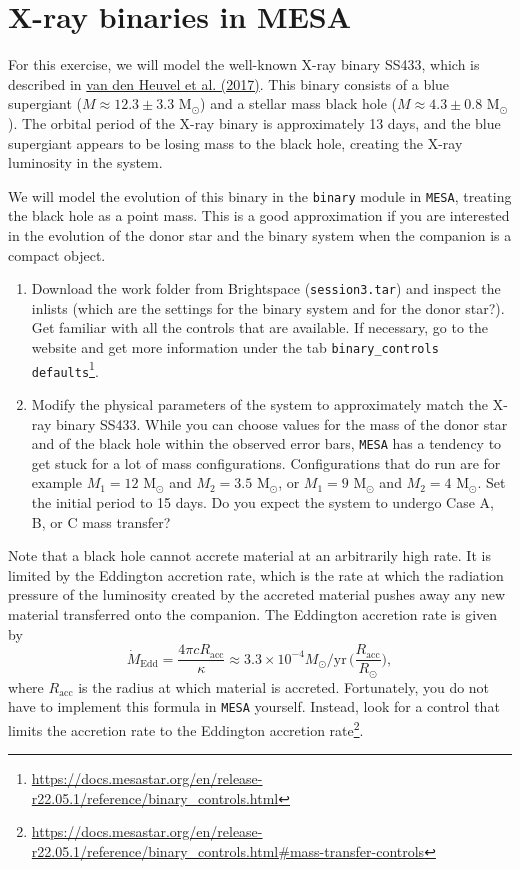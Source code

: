 \documentclass[11pt,a4paper]{article}
\begin{document}
\section{X-ray binaries in MESA}

For this exercise, we will model the well-known X-ray binary SS433, which is described in \href{https://ui.adsabs.harvard.edu/abs/2017MNRAS.471.4256V/abstract}{van den Heuvel et al. (2017)}. This binary consists of a blue supergiant ($M \approx 12.3 \pm 3.3$ M$_\odot$) and a stellar mass black hole ($M \approx 4.3 \pm 0.8$ M$_\odot$). The orbital period of the X-ray binary is approximately 13 days, and the blue supergiant appears to be losing mass to the black hole, creating the X-ray luminosity in the system.

We will model the evolution of this binary in the \texttt{binary} module in \texttt{MESA}, treating the black hole as a point mass. This is a good approximation if you are interested in the evolution of the donor star and the binary system when the companion is a compact object. 

\begin{enumerate}
\item Download the work folder from Brightspace (\verb|session3.tar|) and inspect the inlists (which are the settings for the binary system and for the donor star?). Get familiar with all the controls that are available. If necessary, go to the website and get more information under the tab \verb|binary_controls defaults|\footnote{\url{https://docs.mesastar.org/en/release-r22.05.1/reference/binary_controls.html}}. 
\item Modify the physical parameters of the system to approximately match the X-ray binary SS433. While you can choose values for the mass of the donor star and of the black hole within the observed error bars, \texttt{MESA} has a tendency to get stuck for a lot of mass configurations. Configurations that do run are for example $M_1=12$  M$_\odot$ and $M_2=3.5$  M$_\odot$, or $M_1=9$  M$_\odot$ and $M_2=4$  M$_\odot$. Set the initial period to 15 days. Do you expect the system to undergo Case A, B, or C mass transfer?
\end{enumerate}

\noindent
Note that a black hole cannot accrete material at an arbitrarily high rate. It is limited by the Eddington accretion rate, which is the rate at which the radiation pressure of the luminosity created by the accreted material pushes away any new material transferred onto the companion. The Eddington accretion rate is given by
\begin{equation*}
\dot{M}_{\mathrm{Edd}} = \frac{4\pi cR_{\mathrm{acc}}}{\kappa} \approx 3.3 \times 10^{-4} M_\odot/\mathrm{yr}\, \bigg(\frac{R_{\mathrm{acc}}}{R_\odot}\bigg),
\end{equation*}
where $R_{\mathrm{acc}}$ is the radius at which material is accreted. Fortunately, you do not have to implement this formula in \texttt{MESA} yourself. Instead, look for a control that limits the accretion rate to the Eddington accretion rate\footnote{\url{https://docs.mesastar.org/en/release-r22.05.1/reference/binary_controls.html\#mass-transfer-controls}}.
\end{document}

